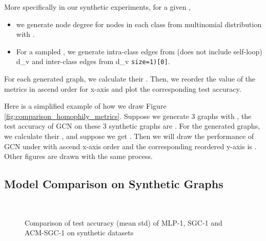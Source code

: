 \documentclass{article}
\newcommand{\0}{{\boldsymbol{0}}}
\newcommand{\6}{{\partial}}
\newcommand{\8}{{\infty}}
\newcommand{\4}{{\nabla}}
\begin{document}
More specifically in our synthetic experiments, for a given ,
\begin{itemize}
    \item we generate node degree  for nodes in each class from multinomial distribution with . 
    \item For a sampled , we generate intra-class edges from (does not include self-loop) d_v  and inter-class edges from d_v  \texttt{size=1)[0]}.
\end{itemize}

For each generated graph, we calculate their . Then, we reorder the value of the metrics in ascend order for x-axis and plot the corresponding test accuracy.

Here is a simplified example of how we draw Figure \ref{fig:comparison_homophily_metrics}. Suppose we generate 3 graphs with , the test accuracy of GCN on these 3 synthetic graphs are . For the generated graphs, we calculate their , and suppose we get . Then we will draw the performance of GCN under  with ascend x-axis order  and the corresponding reordered y-axis is . Other figures are drawn with the same process.
\subsection{Model Comparison on Synthetic Graphs}
\label{appendix:model_comparison_synthetic_datasets}

\begin{figure}[H]
    \centering
     {
      \\
     }
     \caption{Comparison of test accuracy (mean  std) of MLP-1, SGC-1 and ACM-SGC-1 on synthetic datasets}
     \label{fig:sgc_acmsgc_synthetic_comparison}
\end{figure}
\end{document}
